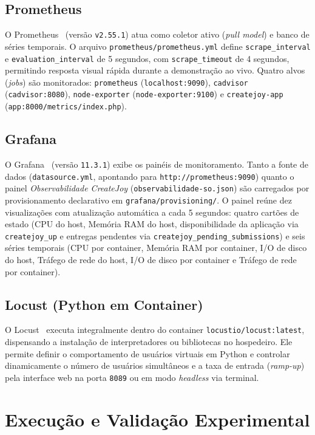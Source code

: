 \documentclass[conference]{IEEEtran}
\begin{document}
\subsection{Prometheus}
O Prometheus~\cite{prometheus} (versão \texttt{v2.55.1}) atua como coletor ativo (\textit{pull model}) e banco de séries temporais. O arquivo \texttt{prometheus/prometheus.yml} define \texttt{scrape\_interval} e \texttt{evaluation\_interval} de 5 segundos, com \texttt{scrape\_timeout} de 4 segundos, permitindo resposta visual rápida durante a demonstração ao vivo. Quatro alvos (\textit{jobs}) são monitorados: \texttt{prometheus} (\texttt{localhost:9090}), \texttt{cadvisor} (\texttt{cadvisor:8080}), \texttt{node-exporter} (\texttt{node-exporter:9100}) e \texttt{createjoy-app} (\texttt{app:8000/metrics/index.php}).

\subsection{Grafana}
O Grafana~\cite{grafana} (versão \texttt{11.3.1}) exibe os painéis de monitoramento. Tanto a fonte de dados (\texttt{datasource.yml}, apontando para \texttt{http://prometheus:9090}) quanto o painel \textit{Observabilidade CreateJoy} (\texttt{observabilidade-so.json}) são carregados por provisionamento declarativo em \texttt{grafana/provisioning/}. O painel reúne dez visualizações com atualização automática a cada 5 segundos: quatro cartões de estado (CPU do host, Memória RAM do host, disponibilidade da aplicação via \texttt{createjoy\_up} e entregas pendentes via \texttt{createjoy\_pending\_submissions}) e seis séries temporais (CPU por container, Memória RAM por container, I/O de disco do host, Tráfego de rede do host, I/O de disco por container e Tráfego de rede por container).

\subsection{Locust (Python em Container)}
O Locust~\cite{locust} executa integralmente dentro do container \texttt{locustio/locust:latest}, dispensando a instalação de interpretadores ou bibliotecas no hospedeiro. Ele permite definir o comportamento de usuários virtuais em Python e controlar dinamicamente o número de usuários simultâneos e a taxa de entrada (\textit{ramp-up}) pela interface web na porta \texttt{8089} ou em modo \textit{headless} via terminal.

\section{Execução e Validação Experimental}
\end{document}
